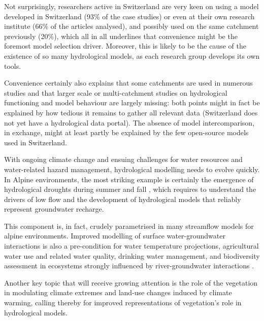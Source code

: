 \documentclass[10pt,a4paper]{article}
\begin{document}
Not surprisingly, researchers active in Switzerland are very keen on using a model developed in Switzerland (93\% of the case studies) or even at their own research institute (66\% of the articles analysed), and possibly used on the same catchment previously (20\%), which all in all underlines that convenience might be the foremost model selection driver. Moreover, this is likely to be the cause of the existence of so many hydrological models, as each research group develops its own tools.

Convenience certainly also explains that some catchments are used in numerous studies and that larger scale or multi-catchment studies on hydrological functioning and model behaviour are largely missing: both points might in fact be explained by how tedious it remains to gather all relevant data (Switzerland does not yet have a hydrological data portal). The absence of model intercomparison, in exchange, might at least partly be explained by the few open-source models used in
Switzerland. 

With ongoing climate change and ensuing challenges for water resources and water-related hazard management, hydrological modelling needs to evolve quickly. In Alpine environments, the most striking example is certainly the emergence of hydrological droughts \citep{Van_Loon_2015} during summer and fall \citep{brunner2019drought,Rigling2020}, which requires to understand the drivers of low flow \citep{Arnoux_2020} and the development of hydrological models that reliably represent groundwater recharge.

This component is, in fact, crudely parametrised in many streamflow models for alpine environments. Improved modelling of surface water-groundwater interactions is also a pre-condition for water temperature projections, agricultural water use and related water quality, drinking water management, and biodiversity assessment in ecosystems strongly influenced by river-groundwater interactions \citep{Brunner_2017}. 

Another key topic that will receive growing attention is the role of the vegetation in modulating climate extremes \citep{Mastrotheodoros_2020} and land-use changes induced by climate warming, calling thereby for improved representations of vegetation's role in hydrological models.
\end{document}
